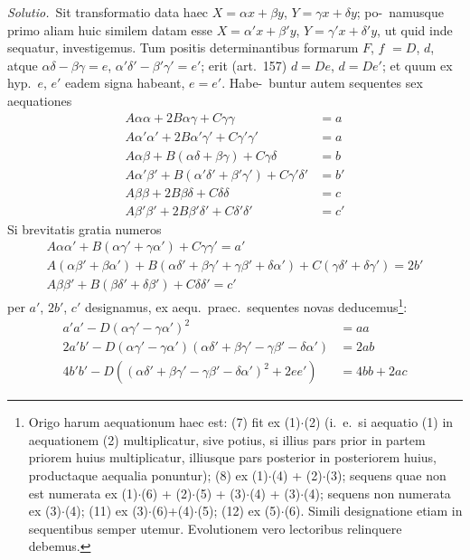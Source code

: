 \documentclass[12pt,a4paper]{article}
\theoremstyle{plain}
\theoremstyle{definition}
\theoremstyle{remark}
\begin{document}
\emph{Solutio.}\ Sit transformatio data haec $X = \alpha x + \beta y$, $Y = \gamma x + \delta y$; po-\ namusque primo aliam huic similem datam esse $X = \alpha' x + \beta' y$, $Y = \gamma' x + \delta' y$,
ut quid inde sequatur, investigemus. Tum positis determinantibus formarum
$F$, $f$ $= D$, $d$, atque $\alpha\delta - \beta\gamma = e$, $\alpha'\delta' - \beta'\gamma' = e'$; erit (art.~157)
$d = De$, $d = De'$; et quum ex hyp.\ $e$, $e'$ eadem signa habeant, $e = e'$. Habe-\ buntur autem sequentes sex aequationes
\begin{align*}
A\alpha\alpha + 2B\alpha\gamma + C\gamma\gamma &= a \tag{1} \\
A\alpha'\alpha' + 2B\alpha'\gamma' + C\gamma'\gamma' &= a \tag{2} \\
A\alpha\beta + B(\alpha\delta + \beta\gamma) + C\gamma\delta &= b \tag{3} \\
A\alpha'\beta' + B(\alpha'\delta' + \beta'\gamma') + C\gamma'\delta' &= b' \tag{4} \\
A\beta\beta + 2B\beta\delta + C\delta\delta &= c \tag{5} \\
A\beta'\beta' + 2B\beta'\delta' + C\delta'\delta' &= c' \tag{6}
\end{align*}
Si brevitatis gratia numeros
\begin{gather*}
A\alpha\alpha' + B(\alpha\gamma' + \gamma\alpha') + C\gamma\gamma' = a' \\
A(\alpha\beta' + \beta\alpha') + B(\alpha\delta' + \beta\gamma' + \gamma\beta' + \delta\alpha') + C(\gamma\delta' + \delta\gamma') = 2b' \\
A\beta\beta' + B(\beta\delta' + \delta\beta') + C\delta\delta' = c'
\end{gather*}
per $a'$, $2b'$, $c'$ designamus, ex aequ.\ praec.\ sequentes novas deducemus\footnote{Origo harum aequationum haec est: (7) fit ex (1)$\cdot$(2) (i.~e.\ si aequatio (1) in aequationem (2) multiplicatur, sive potius, si illius pars prior in partem priorem huius multiplicatur, illiusque pars posterior in posteriorem huius, productaque aequalia ponuntur); (8) ex (1)$\cdot$(4) + (2)$\cdot$(3); sequens quae non est numerata ex (1)$\cdot$(6) + (2)$\cdot$(5) + (3)$\cdot$(4) + (3)$\cdot$(4); sequens non numerata ex (3)$\cdot$(4); (11) ex (3)$\cdot$(6)+(4)$\cdot$(5); (12) ex (5)$\cdot$(6). Simili designatione etiam in sequentibus semper utemur. Evolutionem vero lectoribus relinquere debemus.}:
\begin{align*}
a'a' - D(\alpha\gamma' - \gamma\alpha')^2 &= aa \tag{7} \\
2a'b' - D(\alpha\gamma' - \gamma\alpha')(\alpha\delta' + \beta\gamma' - \gamma\beta' - \delta\alpha') &= 2ab \tag{8} \\
4b'b' - D((\alpha\delta' + \beta\gamma' - \gamma\beta' - \delta\alpha')^2 + 2ee') &= 4bb + 2ac \tag{9}
\end{align*}
\end{document}
